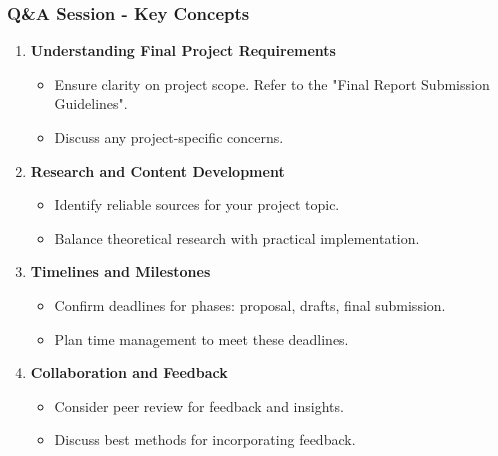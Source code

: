 \documentclass[aspectratio=169]{beamer}
\begin{document}
\begin{frame}[fragile]
    \frametitle{Q\&A Session - Key Concepts}
    \begin{enumerate}
        \item \textbf{Understanding Final Project Requirements}
        \begin{itemize}
            \item Ensure clarity on project scope. Refer to the "Final Report Submission Guidelines".
            \item Discuss any project-specific concerns.
        \end{itemize}
        
        \item \textbf{Research and Content Development}
        \begin{itemize}
            \item Identify reliable sources for your project topic.
            \item Balance theoretical research with practical implementation.
        \end{itemize}

        \item \textbf{Timelines and Milestones}
        \begin{itemize}
            \item Confirm deadlines for phases: proposal, drafts, final submission.
            \item Plan time management to meet these deadlines.
        \end{itemize}
        
        \item \textbf{Collaboration and Feedback}
        \begin{itemize}
            \item Consider peer review for feedback and insights.
            \item Discuss best methods for incorporating feedback.
        \end{itemize}
    \end{enumerate}
\end{frame}
\end{document}

